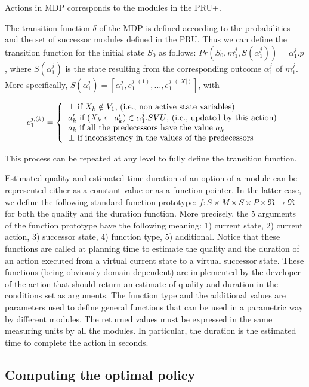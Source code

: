 Actions in MDP corresponds to the modules in the PRU+. 

The transition function $\delta$ of the MDP is defined according to the probabilities and the set of successor modules defined in the PRU.
Thus we can define the transition function for the initial state $S_0$ as follows: 
$Pr(S_0,m_1^j,S(\alpha_1^j)) = \alpha_1^j.p$, where
$S(\alpha_1^j)$ is the state resulting from the corresponding outcome $\alpha_1^j$ of $m_1^j$.
More specifically, $S(\alpha_1^j) = [ \alpha_1^j, e_1^{j,(1)}, \ldots, e_1^{j,(|X|)} ]$,
with
 
\[ e_1^{j,(k)} = \left\{ 
\begin{tabular}{l} 
$\bot$ if $X_k \notin V_1$, (i.e., non active state variables) \\  
$a'_k$ if $(X_k \leftarrow a'_k) \in \alpha_1^j.SVU$, (i.e., updated by this action) \\
$a_k$  if all the predecessors have the value $a_k$ \\
$\bot$ if inconsistency in the values of the predecessors \\
\end{tabular} \right. \]

This process can be repeated at any level to fully define the transition function.


Estimated quality and estimated time duration of an option of a module can be represented either as a constant value or as a function pointer. In the latter case, we define the following standard function prototype: $f : S \times M \times S \times P \times \Re \rightarrow \Re$ for both the quality and the duration function. More precisely, the 5 arguments of the function prototype have the following meaning: 1) current state, 2) current action, 3) successor state, 4) function type, 5) additional. Notice that these functions are called at planning time to estimate the quality and the duration of an action executed from a virtual current state to a virtual successor state. These functions (being obviously domain dependent) are implemented by the developer of the action that should return an estimate of quality and duration in the  conditions set as arguments. The function type and the additional values are parameters used to define general functions that can be used in a parametric way by different modules.
The returned values must be expressed in the same measuring units by all the modules. In particular, the duration is the estimated time to complete the action in seconds.

\subsection{Computing the optimal policy}

